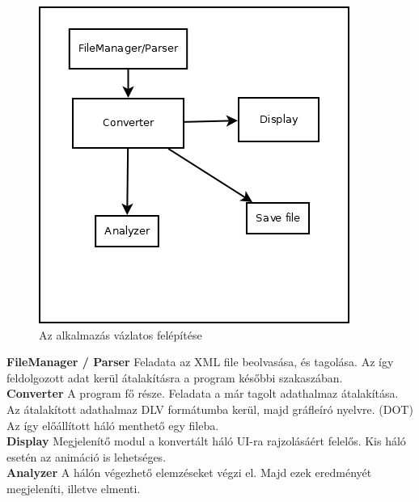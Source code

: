\begin{figure}[h!]
\centering
\includegraphics[scale=0.6]{images/scheme.png}
\caption{Az alkalmazás vázlatos felépítése}
\label{fig:scheme}
\end{figure}

\textbf{FileManager / Parser } Feladata az XML file beolvasása, és tagolása. Az így feldolgozott adat kerül átalakításra a program későbbi szakaszában.\\
\textbf{Converter} A program fő része. Feladata a már tagolt adathalmaz átalakítása. Az átalakított adathalmaz DLV formátumba kerül, majd gráfleíró nyelvre. (DOT) Az így előállított háló menthető egy fileba.\\
\textbf{Display} Megjelenítő modul a konvertált háló UI-ra rajzolásáért felelős. Kis háló esetén az animáció is lehetséges.\\
\textbf{Analyzer} A hálón végezhető elemzéseket végzi el. Majd ezek eredményét megjeleníti, illetve elmenti. 


